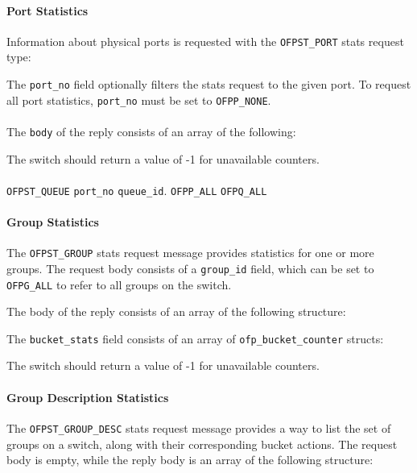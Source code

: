 \paragraph{Port Statistics}
Information about physical ports is requested with the \verb|OFPST_PORT| stats request type:


The \verb|port_no| field optionally filters the stats request to the given port.  To request all port statistics, \verb|port_no| must be set to \verb|OFPP_NONE|.
\\\\
The \verb|body| of the reply consists of an array of the following:


The switch should return a value of -1 for unavailable counters.

\paragraph{}
 \verb|OFPST_QUEUE|  \verb|port_no|  \verb|queue_id|. \verb|OFPP_ALL|
 \verb|OFPQ_ALL| 
\paragraph{Group Statistics}
The \verb|OFPST_GROUP| stats request message provides statistics for one or more groups.  The request body consists of a \verb|group_id| field, which can be set to \verb|OFPG_ALL| to refer to all groups on the switch.


The body of the reply consists of an array of the following structure:


The \verb|bucket_stats| field consists of an array of \verb|ofp_bucket_counter| structs:


The switch should return a value of -1 for unavailable counters.
\paragraph{Group Description Statistics}
The \verb|OFPST_GROUP_DESC| stats request message provides a way to list the set of groups on a switch, along with their corresponding bucket actions.  The request body is empty, while the reply body is an array of the following structure:

